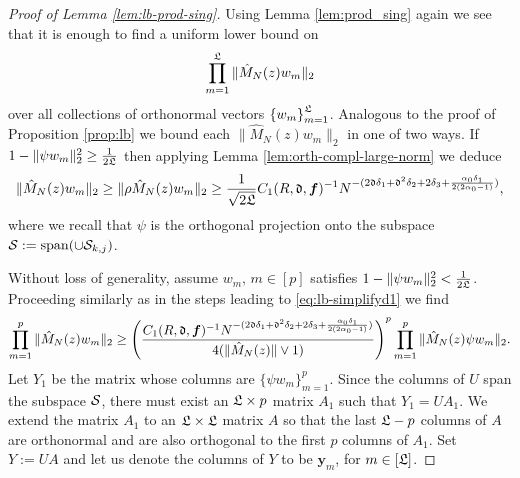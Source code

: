 \documentclass{amsart}
\numberwithin{equation}{section}
\def\corEE{\textcolor{amethyst}}
\def\corEE{}
\def\corAB{}
\def\corABrev{\textcolor{black}}
\begin{document}

\begin{proof}[Proof of Lemma \ref{lem:lb-prod-sing}]
Using Lemma \ref{lem:prod_sing} \corAB{again} we see that it is enough to find a uniform lower bound on
  \[
   \prod_{m=1}^{\mathfrak{L}}
    \| \hat{M}_{N}(z) w_m\|_2
  \]
  over all collections of orthonormal vectors $\left\{ w_m \right\}_{m=1}^{\mathfrak{L}}$. \corAB{Analogous to the proof of Proposition \ref{prop:lb} we bound each $\| \hat{M}_{N}(z) w_m\|_2$ in one of two ways}. If $1-\|{\psi} w_m\|^2_2 \geq \frac{1}{2\mathfrak{L}}$ then applying Lemma \ref{lem:orth-compl-large-norm} we \corAB{deduce}
  \begin{equation} \label{eq:lb0}
    \| \hat{M}_{N}(z) w_m\|_2
    \geq
    \|{\rho} \hat{M}_{N}(z) w_m\|_2
    \geq
    \frac{1}{\sqrt{2\gL}} C_1(R,\gd, {\bm f})^{-1}N^{-(2\gd \delta_1+\corEE{\gd}^2\delta_2+2\delta_3+\corABrev{\frac{\alpha_0\delta_1}{2(2\alpha_0-1)}})},
  \end{equation}
  \corAB{where we recall that ${\psi}$ is the orthogonal projection onto the subspace ${\mathcal{S}}:=\operatorname{span}(\cup \mathcal{S}_{k,j})$}.

  Without loss of generality, assume  $w_m,\, m \in [p]$ satisfies $1-\|{\psi} w_m\|^2_2 < \frac{1}{2\mathfrak{L}}$. \corAB{\corEE{Proceeding} similarly as in the steps leading to \eqref{eq:lb-simplifyd1} we find}
 \begin{equation}\label{eq:lb-simplify}
\prod_{m=1}^p   \|\hat{M}_{N}(z) w_m\|_2 \ge \left(\frac{C_1(R,\gd, {\bm f})^{-1}N^{-(2\gd \delta_1+\corEE{\gd}^2\delta_2+2\delta_3+\corABrev{\frac{\alpha_0\delta_1}{2(2\alpha_0-1)}})}}{4(\|\hat{M}_{N}(z)\|\vee 1)}\right)^p \prod_{m=1}^p\| \hat{M}_{N}(z) {\psi} w_m\|_2.
 \end{equation}
 Let $Y_1$ be the matrix whose columns are $\{{\psi}w_m\}_{m=1}^p$. Since the columns of $U$ span the subspace $\mathcal{S}$, there must exist \corEE{an} $\mathfrak{L} \times p$ matrix $A_1$ such that $Y_1=U A_1$. We extend the matrix $A_1$ to \corEE{an} $\mathfrak{L} \times \mathfrak{L}$ matrix $A$ so that the last $\mathfrak{L}-p$ columns of $A$ are orthonormal and are also orthogonal to the first $p$ columns of $A_1$.
 Set $Y:=U A$ and let us denote the columns of $Y$ to be ${\bm y}_m$, for $m \in [\mathfrak{L}]$.


\end{proof}
\end{document}
